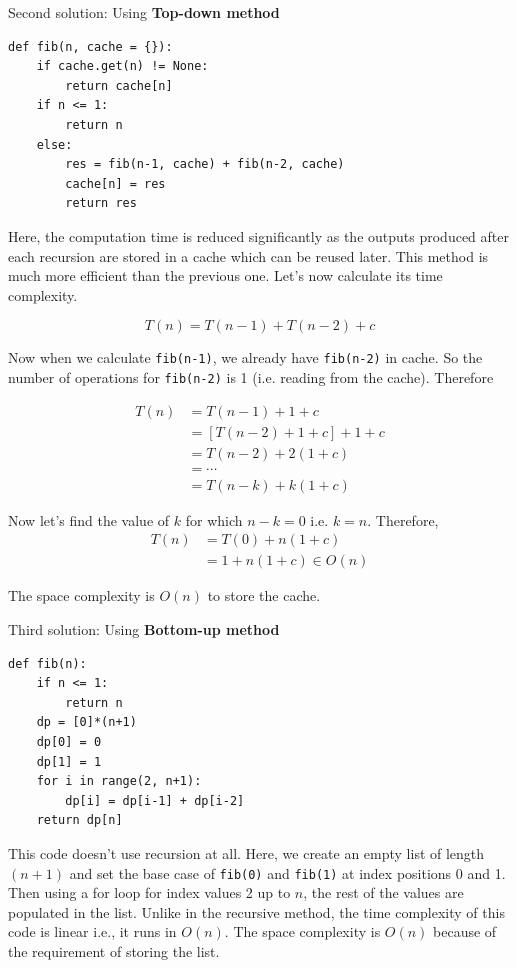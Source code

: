 \documentclass[a4paper,11pt]{book}
\begin{document}
\noindent Second solution: Using \textbf{Top-down method}

\begin{lstlisting}
def fib(n, cache = {}):
    if cache.get(n) != None:
        return cache[n]
    if n <= 1:
        return n
    else:
        res = fib(n-1, cache) + fib(n-2, cache)
        cache[n] = res
        return res
\end{lstlisting}

\noindent Here, the computation time is reduced significantly as the outputs produced after each recursion are stored in a cache which can be reused later. This method is much more efficient than the previous one. Let's now calculate its time complexity.

$$T(n) = T(n-1) + T(n-2) + c$$

\noindent Now when we calculate \lstinline{fib(n-1)}, we already have \lstinline{fib(n-2)} in cache. So the number of operations for \lstinline{fib(n-2)} is 1 (i.e. reading from the cache). Therefore

\begin{align*}
    T(n) &= T(n-1) + 1 + c\\
         &=\left[T(n-2) + 1 + c\right] + 1 + c\\
         &=T(n-2) + 2(1+c)\\
         &= \cdots\\
         &= T(n-k) + k(1+c)
\end{align*}

\noindent Now let's find the value of $k$ for which $n-k = 0$ i.e. $k=n$. Therefore,
\begin{align*}
	T(n) &= T(0) + n(1+c)\\
	     &= 1 + n(1+c) \in O(n)
\end{align*}

\noindent The space complexity is $O(n)$ to store the cache.
\vspace{3mm}

\noindent Third solution: Using \textbf{Bottom-up method}

\begin{lstlisting}
def fib(n):
    if n <= 1:
        return n
    dp = [0]*(n+1)
    dp[0] = 0
    dp[1] = 1 
    for i in range(2, n+1):
        dp[i] = dp[i-1] + dp[i-2]
    return dp[n]
\end{lstlisting}

\noindent This code doesn't use recursion at all. Here, we create an empty list of length $(n+1)$ and set the base case of \lstinline{fib(0)} and \lstinline{fib(1)} at index positions 0 and 1. Then using a for loop for index values 2 up to $n$, the rest of the values are populated in the list. Unlike in the recursive method, the time complexity of this code is linear i.e., it runs in $O(n)$. The space complexity is $O(n)$ because of the requirement of storing the list.
\end{document}
